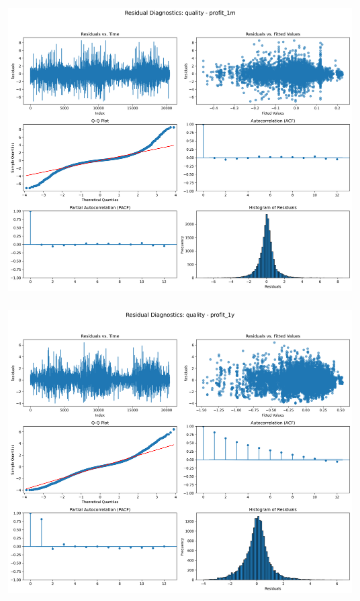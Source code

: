 \documentclass[11pt,english,a4paper,hidelinks]{book}
\begin{document}
\begin{figure}[H]
    \centering
    \begin{subfigure}[b]{0.32\textwidth}
        \centering
        \includegraphics[width=\textwidth]{images/code/models/linear_regression/first_model/USA/quality_profit_1m_residuals - Gaussian.png}
    \end{subfigure}
    \hfill
    \begin{subfigure}[b]{0.32\textwidth}
        \centering
        \includegraphics[width=\textwidth]{images/code/models/linear_regression/first_model/USA/quality_profit_1y_residuals - Gaussian.png}

\end{subfigure}
\end{figure}
\end{document}
